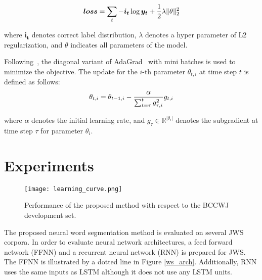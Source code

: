 \documentclass[11pt,letterpaper]{article}
\begin{document}
\begin{equation} 
 \bm{loss} = \sum_{t} -\bm{i_t} \log \bm{y_t} +  \frac{1}{2}\lambda \|\theta\|_{2}^2
 \vspace{6pt}
 \end{equation}



\noindent
where $\bm{i_{t}}$ denotes correct label distribution, $\lambda$ denotes a hyper parameter of L2 regularization, and $\theta$ indicates all parameters of the model. 
 
Following~\cite{socher2013parsing}, the diagonal variant of AdaGrad~\cite{duchi2011adaptive} with mini batches is used to minimize the objective. The update for the $i$-th parameter $\theta_{t,i}$ at time step $t$ is defined as follows:
\begin{equation}
\theta_{t,i} = \theta_{t-1,i} - \frac{\alpha }{\sum^{t}_{t=\tau} g^{2}_{\tau,i}}g_{t,i} 
\vspace{6pt}
\end{equation}

\noindent
where $\alpha$ denotes the initial learning rate, and $g_{\tau} \in \mathbb{R}^{|\theta_{i}|} $ denotes the subgradient at time step $\tau$ for parameter $\theta_{i}$. 







 
\section{Experiments}
\begin{figure}[t]    
 \begin{center}    
 \texttt{[image: learning\_curve.png]}              
 \caption{Performance of the proposed method with respect to the BCCWJ development set.}    
 \label{learning_curve}    
\end{center}    
\end{figure}




The proposed neural word segmentation method is evaluated on several JWS corpora.
In order to evaluate neural network architectures, a feed forward network (FFNN) and a recurrent neural network (RNN) is prepared for JWS. The FFNN is illustrated by a dotted line in Figure \ref{ws_arch}. Additionally, RNN uses the same inputs as LSTM although it does not use any LSTM units.
\end{document}
